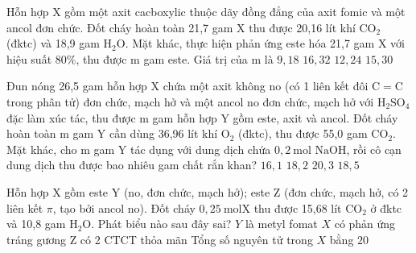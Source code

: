 \begin{vdex}
	Hỗn hợp X gồm một axit cacboxylic thuộc dãy đồng đẳng của axit fomic và một ancol đơn chức. Đốt cháy hoàn toàn 21,7 gam $\mathrm{X}$ thu được 20,16 lít khí $\mathrm{CO}_2$ (đktc) và 18,9 gam $\mathrm{H}_2 \mathrm{O}$. Mặt khác, thực hiện phản ứng este hóa 21,7 gam $\mathrm{X}$ với hiệu suất $80 \%$, thu được $\mathrm{m}$ gam este. Giá trị của $\mathrm{m}$ là
	\choice
	{%
		$ 9,18 $
	}
	{%
		$ 16,32 $
	}
	{%
	\True	$ 12,24 $
	}
	{%
		$ 15,30 $
	}
	\huongdan
	{%
		
		
		
	}			
\end{vdex}
\begin{vdex}
Đun nóng 26,5 gam hỗn hợp $\mathrm{X}$ chứa một axit không no (có 1 liên kết đôi $\mathrm{C}=\mathrm{C}$ trong phân tử) đơn chức, mạch hở và một ancol no đơn chức, mạch hở với $\mathrm{H}_2 \mathrm{SO}_4$ đặc làm xúc tác, thu được $\mathrm{m}$ gam hỗn hợp $\mathrm{Y}$ gồm este, axit và ancol. Đốt cháy hoàn toàn $\mathrm{m}$ gam $\mathrm{Y}$ cần dùng 36,96 lít khí $\mathrm{O}_2$ (đktc), thu được 55,0 gam $\mathrm{CO}_2$. Mặt khác, cho $\mathrm{m}$ gam $\mathrm{Y}$ tác dụng với dung dịch chứa $0,2 \mathrm{~mol}$ $\mathrm{NaOH}$, rồi cô cạn dung dịch thu được bao nhiêu gam chất rắn khan?
	\choice
	{%
		$ 16,1 $
	}
	{%
		$ 18,2 $
	}
	{%
	\True	$ 20,3 $
	}
	{%
		$ 18,5 $
	}
	\huongdan
	{%
		
		
		
	}			
\end{vdex}
\begin{vdex}
Hỗn hợp $\mathrm{X}$ gồm este $\mathrm{Y}$ (no, đơn chức, mạch hở); este $\mathrm{Z}$ (đơn chức, mạch hở, có 2 liên kết $\pi$, tạo bởi ancol no). Đốt cháy $0,25 \mathrm{~mol} \mathrm{X}$ thu được 15,68 lít $\mathrm{CO}_2$ ở đktc và 10,8 gam $\mathrm{H}_2 \mathrm{O}$. Phát biểu nào sau đây sai?
	\choice
	{%
		$Y$ là metyl fomat
	}
	{%
		$X$ có phản ứng tráng gương
	}
	{%
	\True	$\mathrm{Z}$ có 2 CTCT thỏa mãn
	}
	{%
		Tổng số nguyên tử trong $X$ bằng $ 20 $
	}
	\huongdan
	{%
		
		
		
	}			
\end{vdex}

